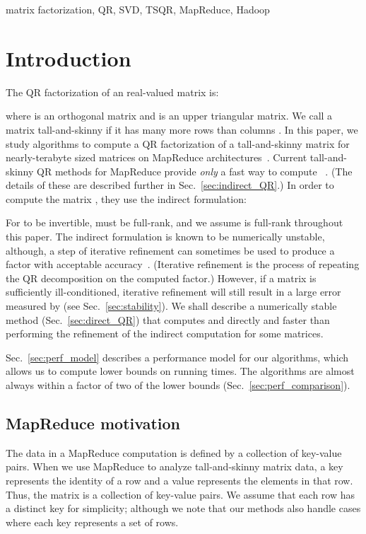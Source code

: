 \documentclass[10pt, conference, compsocconf]{IEEEtran}
\begin{document}
\begin{IEEEkeywords}
matrix factorization, QR, SVD, TSQR, MapReduce, Hadoop
\end{IEEEkeywords}


\IEEEpeerreviewmaketitle

\section{Introduction}
The QR factorization of an  real-valued matrix  is: 

where  is an  orthogonal matrix and  is an  upper triangular matrix.  We call a matrix tall-and-skinny if it has many more rows than columns .  In this paper, we study algorithms to compute a QR factorization of a tall-and-skinny matrix for nearly-terabyte sized matrices on MapReduce architectures~\cite{Dean2004-MapReduce}. Current tall-and-skinny QR methods for MapReduce provide \emph{only} a fast way to compute ~\cite{Constantine-2011-TSQR-MapReduce}. (The details of these are described further in Sec.~\ref{sec:indirect_QR}.)  In order to compute the matrix , they use the indirect formulation: 

For  to be invertible,  must be full-rank, and we assume  is full-rank throughout this paper.  The indirect formulation is known to be numerically unstable, although, a step of iterative refinement can sometimes be used to produce a  factor with acceptable accuracy~\cite{parlett1998}.  (Iterative refinement is the process of repeating the QR decomposition on the computed  factor.)  However, if a matrix is sufficiently ill-conditioned, iterative refinement will still result in a large error measured by  (see Sec.~\ref{sec:stability}).  We shall describe a numerically stable method (Sec.~\ref{sec:direct_QR}) that computes  and  directly and faster than performing the refinement of the indirect computation for some matrices.

Sec.~\ref{sec:perf_model} describes a performance model for our algorithms, which allows us to compute lower bounds on running times.  The algorithms are almost always within a factor of two of the lower bounds (Sec.~\ref{sec:perf_comparison}).



\subsection{MapReduce motivation}


The data in a MapReduce computation is defined by a collection of key-value pairs. When we use MapReduce to analyze tall-and-skinny matrix data, a key represents the identity of a row and a value represents the elements in that row.  Thus, the matrix is a collection of key-value pairs.  We assume that each row has a distinct key for simplicity; although we note that our methods also handle cases where each key represents a set of rows.  
\end{document}
